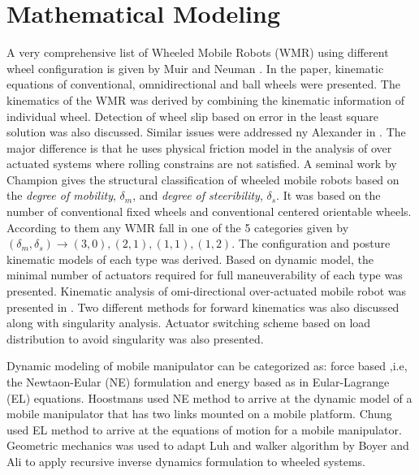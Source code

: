 \section{Mathematical Modeling}
A very comprehensive list of Wheeled Mobile Robots (WMR) using different wheel configuration is given by Muir and Neuman \cite{muir1987kinematic}. In the paper, kinematic equations of conventional, omnidirectional and ball wheels were presented. The kinematics of the WMR was derived by combining the kinematic information of   individual wheel. Detection of wheel slip based on  error in the least square solution was also discussed. Similar issues were addressed ny Alexander in \cite{alexander1989kinematics}. The major difference is that he uses physical friction model in the analysis of over actuated systems where rolling constrains are not satisfied. A seminal work by Champion \cite{campion1996structural} gives the structural classification of wheeled mobile robots based on the \textit{degree of mobility}, $\delta_m$, and \textit{degree of steeribility}, $\delta_s$. It was based on the number of conventional fixed wheels and  conventional centered orientable wheels. According to them any WMR fall in one of the 5 categories given by $(\delta_m,\delta_s)\rightarrow(3,0),(2,1),(1,1),(1,2)$. 
The configuration and posture kinematic models of each type was derived. Based on  dynamic model, the minimal number of actuators required for full maneuverability of each type was presented. Kinematic analysis of omi-directional over-actuated mobile robot  was presented in \cite{yi2002kinematics}. Two different methods for forward kinematics was also discussed along with  singularity analysis. Actuator switching scheme based on load distribution to avoid singularity was also presented. 

Dynamic modeling of mobile manipulator can be categorized as: force based ,i.e, the Newtaon-Eular (NE) formulation and  energy based as in Eular-Lagrange (EL) equations. Hoostmans \cite{hootsmans1992motion} used NE method to arrive at  the dynamic model of a mobile manipulator that has two links mounted on a mobile platform. Chung \cite{chung1998interaction} used EL method to arrive at the equations of motion for a mobile manipulator. Geometric mechanics was used to adapt Luh and walker \cite{luh1980line} algorithm  by Boyer and Ali \cite{boyer2011recursive} to apply recursive inverse dynamics formulation to wheeled systems.   

